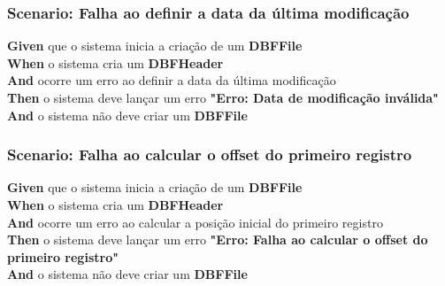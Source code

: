 \subsubsection{Scenario: Falha ao definir a data da última modificação}
\textbf{Given} que o sistema inicia a criação de um \textbf{DBFFile} \\
\textbf{When} o sistema cria um \textbf{DBFHeader} \\
\textbf{And} ocorre um erro ao definir a data da última modificação \\
\textbf{Then} o sistema deve lançar um erro \textbf{"Erro: Data de modificação inválida"} \\
\textbf{And} o sistema não deve criar um \textbf{DBFFile} \\

\subsubsection{Scenario: Falha ao calcular o offset do primeiro registro}
\textbf{Given} que o sistema inicia a criação de um \textbf{DBFFile} \\
\textbf{When} o sistema cria um \textbf{DBFHeader} \\
\textbf{And} ocorre um erro ao calcular a posição inicial do primeiro registro \\
\textbf{Then} o sistema deve lançar um erro \textbf{"Erro: Falha ao calcular o offset do primeiro registro"} \\
\textbf{And} o sistema não deve criar um \textbf{DBFFile} \\

